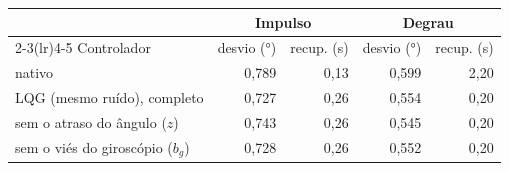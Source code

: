 \begin{tabular}{lrrrr}
\toprule
 & \multicolumn{2}{c}{Impulso} & \multicolumn{2}{c}{Degrau} \\
\cmidrule(lr){2-3}\cmidrule(lr){4-5}
Controlador & desvio (\si{\degree}) & recup. (\si{\second}) & desvio (\si{\degree}) & recup. (\si{\second}) \\
\midrule
nativo & 0,789 & 0,13 & 0,599 & 2,20 \\
LQG (mesmo ruído), completo & 0,727 & 0,26 & 0,554 & 0,20 \\
sem o atraso do ângulo ($z$) & 0,743 & 0,26 & 0,545 & 0,20 \\
sem o viés do giroscópio ($b_g$) & 0,728 & 0,26 & 0,552 & 0,20 \\
\bottomrule
\end{tabular}

